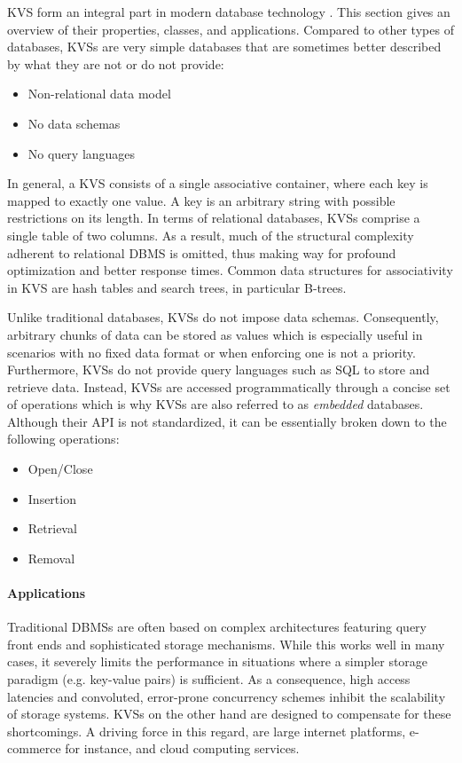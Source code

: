 \ac{KVS} form an integral part in modern database technology
\cite{fiebig2016one}. This section gives an overview of their properties,
classes, and applications. Compared to other types of databases, \acp{KVS} are
very simple databases that are sometimes better described by what they are not
or do not provide:

\begin{itemize}
    \item Non-relational data model
    \item No data schemas
    \item No query languages
\end{itemize}

In general, a \ac{KVS} consists of a single associative container, where each
key is mapped to exactly one value. A key is an arbitrary string with possible
restrictions on its length. In terms of relational databases, \acp{KVS} comprise
a single table of two columns. As a result, much of the structural complexity
adherent to relational \ac{DBMS} is omitted, thus making way for profound
optimization and better response times. Common data structures for associativity
in \ac{KVS} are hash tables and search trees, in particular B-trees.

Unlike traditional databases, \acp{KVS} do not impose data schemas. Consequently,
arbitrary chunks of data can be stored as values which is especially useful in
scenarios with no fixed data format or when enforcing one is not a priority.
Furthermore, \acp{KVS} do not provide query languages such as SQL to store and
retrieve data. Instead, \acp{KVS} are accessed programmatically through a concise
set of operations which is why \acp{KVS} are also referred to as \emph{embedded}
databases. Although their \ac{API} is not standardized, it can be essentially
broken down to the following operations:

\begin{itemize}
    \item Open/Close
    \item Insertion
    \item Retrieval
    \item Removal
\end{itemize}

\paragraph{Applications}

Traditional \acp{DBMS} are often based on complex architectures featuring query
front ends and sophisticated storage mechanisms. While this works well in many
cases, it severely limits the performance in situations where a simpler storage
paradigm (e.g. key-value pairs) is sufficient. As a consequence, high access
latencies and convoluted, error-prone concurrency schemes inhibit the
scalability of storage systems. \acp{KVS} on the other hand are designed to
compensate for these shortcomings. A driving force in this regard, are large
internet platforms, e-commerce for instance, and cloud computing services.

